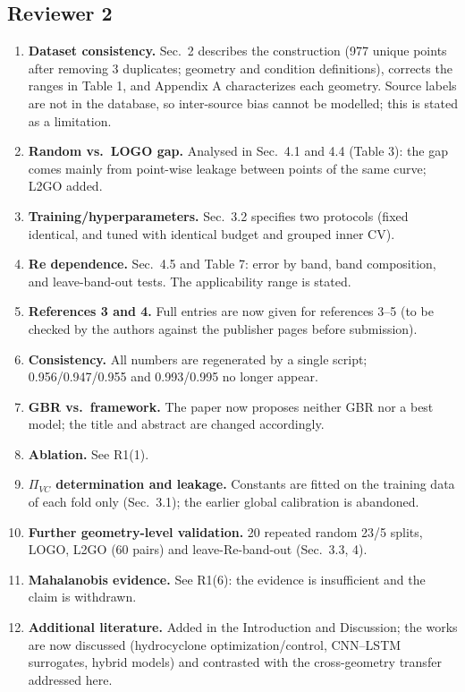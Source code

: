 \documentclass[11pt]{article}\usepackage[margin=2.3cm]{geometry}\usepackage{enumitem}\setlength{\parindent}{0pt}\setlength{\parskip}{4pt}
\begin{document}
\subsection*{Reviewer 2}
\begin{enumerate}[leftmargin=*,label=(\arabic*)]
\item \textbf{Dataset consistency.} Sec.~2 describes the construction (977 unique points after removing 3 duplicates; geometry and condition definitions), corrects the ranges in Table 1, and Appendix A characterizes each geometry. Source labels are not in the database, so inter-source bias cannot be modelled; this is stated as a limitation.
\item \textbf{Random vs.\ LOGO gap.} Analysed in Sec.~4.1 and 4.4 (Table 3): the gap comes mainly from point-wise leakage between points of the same curve; L2GO added.
\item \textbf{Training/hyperparameters.} Sec.~3.2 specifies two protocols (fixed identical, and tuned with identical budget and grouped inner CV).
\item \textbf{Re dependence.} Sec.~4.5 and Table 7: error by band, band composition, and leave-band-out tests. The applicability range is stated.
\item \textbf{References 3 and 4.} Full entries are now given for references 3--5 (to be checked by the authors against the publisher pages before submission).
\item \textbf{Consistency.} All numbers are regenerated by a single script; 0.956/0.947/0.955 and 0.993/0.995 no longer appear.
\item \textbf{GBR vs.\ framework.} The paper now proposes neither GBR nor a best model; the title and abstract are changed accordingly.
\item \textbf{Ablation.} See R1(1).
\item \textbf{$\Pi_{VC}$ determination and leakage.} Constants are fitted on the training data of each fold only (Sec.~3.1); the earlier global calibration is abandoned.
\item \textbf{Further geometry-level validation.} 20 repeated random 23/5 splits, LOGO, L2GO (60 pairs) and leave-Re-band-out (Sec.~3.3, 4).
\item \textbf{Mahalanobis evidence.} See R1(6): the evidence is insufficient and the claim is withdrawn.
\item \textbf{Additional literature.} Added in the Introduction and Discussion; the works are now discussed (hydrocyclone optimization/control, CNN--LSTM surrogates, hybrid models) and contrasted with the cross-geometry transfer addressed here.
\end{enumerate}
\end{document}
